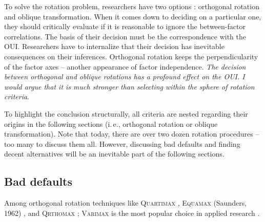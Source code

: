 \documentclass[jou, 11pt]{apa7}
\begin{document}
To solve the rotation problem, researchers have two options : orthogonal rotation and oblique transformation.
When it comes down to deciding on a particular one, they should critically
evaluate if it is reasonable to ignore the between-factor correlations. The
basis of their decision must be the correspondence with the OUI. Researchers
have to internalize that their decision has inevitable consequences on their
inferences. Orthogonal rotation keeps the perpendicularity of the factor axes
-- another appearance of factor independence. \textit{The decision between
  orthogonal and oblique rotations has a profound effect on the OUI. I would
argue that it is much stronger than selecting within the sphere of rotation
criteria}. 

To highlight the conclusion structurally, all criteria are nested regarding
their origins in the following sections (i.\,e., orthogonal rotation or oblique
transformation). Note that today, there are over two dozen rotation procedures
\parencite[pp. 214]{Gorsuch2015} -- too many to discuss them all. However,
discussing bad defaults and finding decent alternatives will be an inevitable
part of the following sections.

\subsection{Bad defaults}

Among orthogonal rotation techniques like \textsc{Quartimax}
\parencite{Carroll1953}, \textsc{Equamax} (Saunders, 1962) , and
\textsc{Qrthomax} \parencite{Harman1970}; \textsc{Varimax}
\parencite[]{Kaiser1958} is the most popular choice in applied research
\parencite{Costello2005, Ford1986, Loo1979}.
\end{document}

